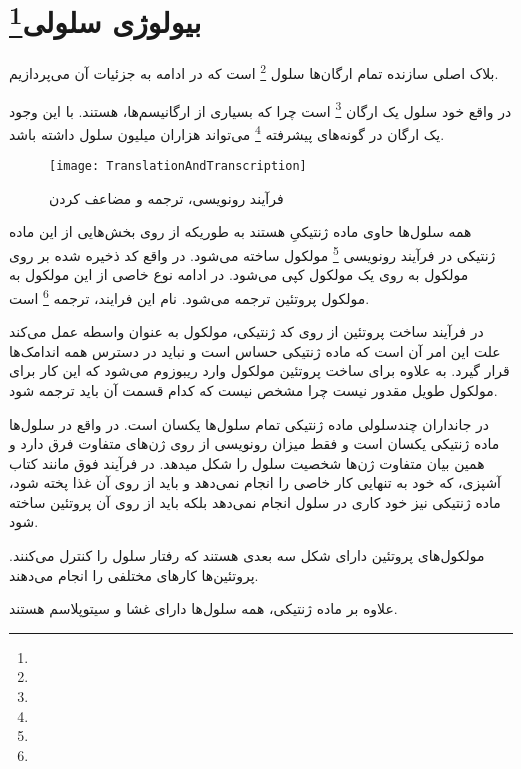\pagebreak
\section{بیولوژی سلولی\protect\footnote{}}

بلاک اصلی سازنده تمام ارگان‌ها سلول
\footnote{}
است که در ادامه به جزئیات آن می‌پردازیم.

در واقع خود سلول یک ارگان
\footnote{}
است چرا که بسیاری از ارگانیسم‌ها،
هستند.
با این وجود یک ارگان در گونه‌های پیشرفته
\footnote{}
می‌تواند هزاران میلیون سلول داشته باشد.

\begin{wrapfigure}{l}{0.5\textwidth} 
    \begin{center}
    \texttt{[image: TranslationAndTranscription]} 
    \end{center}
    \caption{ فرآیند رونویسی، ترجمه و مضاعف کردن}
    \label{figure:translationAndTranscription}
\end{wrapfigure}

همه سلول‌ها حاوی ماده‌ ژنتیکیِ
هستند به طوریکه از روی بخش‌هایی از این ماده ژنتیکی در فرآیند رونویسی
\footnote{}
مولکول
ساخته می‌شود. در واقع کد ذخیره شده بر روی مولکول
به روی یک مولکول
کپی می‌شود. در ادامه نوع خاصی از این مولکول
به مولکول پروتئین ترجمه می‌شود. نام این فرایند، ترجمه
\footnote{}
است.

 در فرآیند ساخت پروتئین از روی کد ژنتیکی، مولکول
به عنوان واسطه عمل می‌کند علت این امر آن است که ماده ژنتیکی حساس است و نباید در دسترس همه اندامک‌ها قرار گیرد. به علاوه برای ساخت پروتئین مولکول
وارد ریبوزوم می‌شود که این کار برای مولکول طویل
مقدور نیست چرا مشخص نیست که کدام قسمت آن باید ترجمه شود.

در جانداران چندسلولی ماده‌ ژنتیکی تمام سلول‌ها یکسان است. در واقع در سلول‌ها ماده‌ ژنتیکی یکسان است و فقط میزان رونویسی از روی ژن‌های متفاوت فرق دارد و همین بیان متفاوت ژن‌ها شخصیت سلول را شکل میدهد. در فرآیند فوق مانند کتاب آشپزی، که خود به تنهایی کار خاصی را انجام نمی‌دهد و باید از روی آن غذا پخته شود، ماده‌ ژنتیکی نیز خود کاری در سلول انجام نمی‌دهد  بلکه باید از روی آن پرو‌تئین ساخته شود. 

\noindent
مولکول‌های پرو‌تئین دارای شکل سه بعدی هستند که رفتار سلول را کنترل می‌کنند. پروتئین‌ها کارهای مختلفی را انجام می‌دهند.

\noindent
علاوه بر ماده ژنتیکی، همه سلول‌ها دارای  غشا و سیتوپلاسم هستند.

